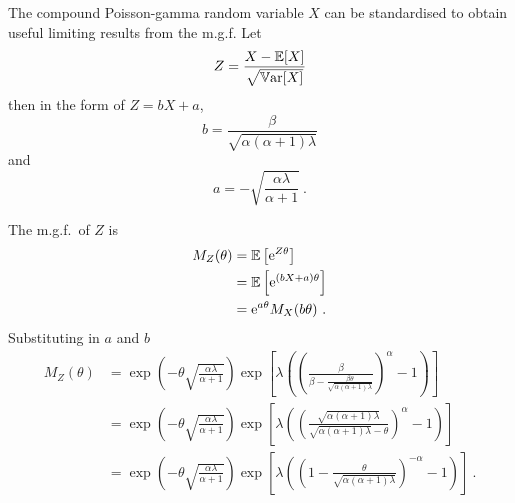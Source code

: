 The compound Poisson-gamma random variable $X$ can be standardised to obtain useful limiting results from the m.g.f. Let
\begin{equation}
  Z = \frac{X-\operatorname{\mathbb{E}}[X]}{\sqrt{\operatorname{\mathbb{V}ar}[X]}}
\end{equation}
then in the form of $Z = bX+a$,
\begin{equation}
  b = \frac{\beta}{\sqrt{\alpha(\alpha+1)\lambda}}
\end{equation}
and
\begin{equation}
  a = -\sqrt{\frac{\alpha\lambda}{\alpha+1}}
  \ .
\end{equation}

The m.g.f.~of $Z$ is
\begin{align}
  M_Z(\theta)&=\operatorname{\mathbb{E}}\left[\mathrm{e}^{Z\theta}\right]
  \nonumber \\
  &=\operatorname{\mathbb{E}}\left[\mathrm{e}^{(bX+a)\theta}\right]
  \nonumber \\
  &=\mathrm{e}^{a\theta}M_X(b\theta)
  \ .
\end{align}
Substituting in $a$ and $b$
\begin{align}
  M_Z(\theta)&=
  \exp\left(
      -\theta\sqrt{\frac{\alpha\lambda}{\alpha+1}}
    \right)
  \exp\left[
    \lambda
    \left(
      \left(
        \frac{\beta}{\beta-\frac{\beta\theta}{\sqrt{\alpha(\alpha+1)\lambda}}}
      \right)^\alpha
      -1
    \right)
  \right]
  \nonumber\\
  &=
  \exp\left(
      -\theta\sqrt{\frac{\alpha\lambda}{\alpha+1}}
    \right)
  \exp\left[
    \lambda
    \left(
      \left(
        \frac{\sqrt{\alpha(\alpha+1)\lambda}}{\sqrt{\alpha(\alpha+1)\lambda}-\theta}
      \right)^\alpha
      -1
    \right)
  \right]
  \nonumber\\
  &=
  \exp\left(
      -\theta\sqrt{\frac{\alpha\lambda}{\alpha+1}}
    \right)
  \exp\left[
    \lambda
    \left(
      \left(
        1-\frac{\theta}{\sqrt{\alpha(\alpha+1)\lambda}} 
      \right)^{-\alpha}
      -1
    \right)
  \right]
  \ .
\end{align}

